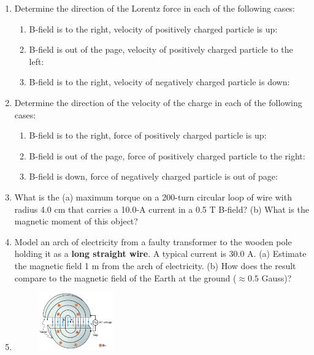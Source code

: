 \documentclass[10pt]{article}
\begin{document}
\begin{enumerate}
\begin{enumerate}
\item Determine the direction of the Lorentz force in each of the following cases:
\begin{enumerate}
\item B-field is to the right, velocity of positively charged particle is up:
\item B-field is out of the page, velocity of positively charged particle to the left:
\item B-field is to the right, velocity of negatively charged particle is down:
\end{enumerate} \vspace{0.2cm}
\item Determine the direction of the velocity of the charge in each of the following cases:
\begin{enumerate}
\item B-field is to the right, force of positively charged particle is up:
\item B-field is out of the page, force of positively charged particle to the right:
\item B-field is down, force of negatively charged particle is out of page:
\end{enumerate} \vspace{0.2cm}
\item What is the (a) maximum torque on a 200-turn circular loop of wire with radius 4.0 cm that carries a 10.0-A current in a 0.5 T B-field? (b) What is the magnetic moment of this object? \\ \vspace{2 cm}
\item Model an arch of electricity from a faulty transformer to the wooden pole holding it as a \textbf{long straight wire}.  A typical current is $30.0$ A. (a) Estimate the magnetic field 1 m from the arch of electricity. (b) How does the result compare to the magnetic field of the Earth at the ground ($\approx 0.5$ Gauss)? \\ \vspace{1cm}
\item 
\begin{figure}[hb]
\centering
\includegraphics[width=0.3\textwidth]{cyclo.png}

\end{figure}
\end{enumerate}
\end{enumerate}
\end{document}
